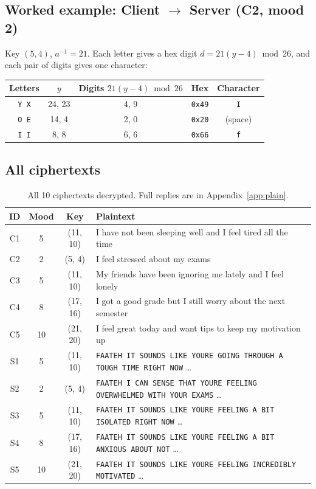 \documentclass[11pt,a4paper]{article}
\DeclareRobustCommand{\_}{\textunderscore\allowbreak}  %
\newcommand{\ct}[1]{\texttt{#1}}
\newcommand{\csdir}{Client $\rightarrow$ Server}
\begin{document}
\subsection{Worked example: \csdir{} (C2, mood 2)}
Key $(5,4)$, $a^{-1}=21$. Each letter gives a hex digit $d = 21(y-4) \bmod 26$, and each pair of digits gives one
character:

\begin{table}[H]\centering
\begin{tabular}{c c c c c}
\toprule
Letters & $y$ & Digits $21(y-4) \bmod 26$ & Hex & Character \\
\midrule
\ct{Y X} & 24, 23 & 4, 9 & \ct{0x49} & \ct{I} \\
\ct{O E} & 14, 4  & 2, 0 & \ct{0x20} & (space) \\
\ct{I I} & 8, 8   & 6, 6 & \ct{0x66} & \ct{f} \\
\bottomrule
\end{tabular}
\end{table}

\subsection{All ciphertexts}

\begin{table}[H]\centering\small
\caption{All 10 ciphertexts decrypted. Full replies are in Appendix~\ref{app:plain}.}
\begin{tabularx}{\textwidth}{c c c X}
\toprule
ID & Mood & Key & Plaintext \\
\midrule
C1 & 5  & (11, 10) & I have not been sleeping well and I feel tired all the time \\
C2 & 2  & (5, 4)   & I feel stressed about my exams \\
C3 & 5  & (11, 10) & My friends have been ignoring me lately and I feel lonely \\
C4 & 8  & (17, 16) & I got a good grade but I still worry about the next semester \\
C5 & 10 & (21, 20) & I feel great today and want tips to keep my motivation up \\
\midrule
S1 & 5  & (11, 10) & \ct{FAATEH IT SOUNDS LIKE YOURE GOING THROUGH A TOUGH TIME RIGHT NOW} \ldots \\
S2 & 2  & (5, 4)   & \ct{FAATEH I CAN SENSE THAT YOURE FEELING OVERWHELMED WITH YOUR EXAMS} \ldots \\
S3 & 5  & (11, 10) & \ct{FAATEH IT SOUNDS LIKE YOURE FEELING A BIT ISOLATED RIGHT NOW} \ldots \\
S4 & 8  & (17, 16) & \ct{FAATEH IT SOUNDS LIKE YOURE FEELING A BIT ANXIOUS ABOUT NOT} \ldots \\
S5 & 10 & (21, 20) & \ct{FAATEH IT SOUNDS LIKE YOURE FEELING INCREDIBLY MOTIVATED} \ldots \\
\bottomrule
\end{tabularx}
\end{table}
\end{document}
